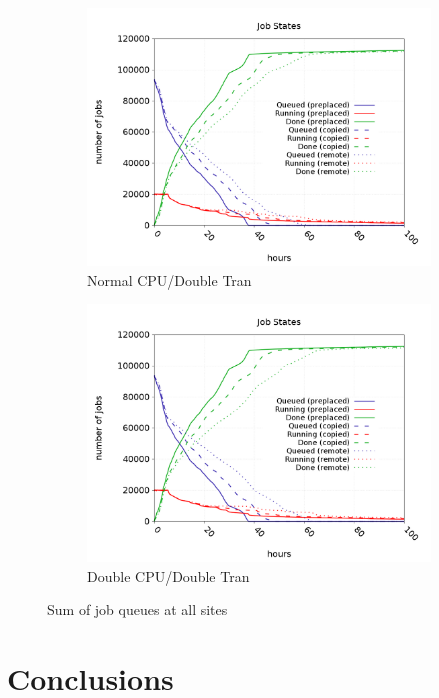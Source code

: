 \documentclass[a4paper]{jpconf}
\begin{document}
\begin{figure}
\begin{subfigure}{0.3\textwidth}
    \includegraphics[width=\textwidth]{figures/FP1_RP0CPU.png}
    \caption{Normal CPU/Double Tran}
  \end{subfigure}
  \begin{subfigure}{0.3\textwidth}
    \includegraphics[width=\textwidth]{figures/FP1_RP1CPU.png}
    \caption{Double CPU/Double Tran}
  \end{subfigure}
  \caption{Sum of job queues at all sites\label{fig:jobQueues}}
\end{figure}

\section{Conclusions}
\end{document}
